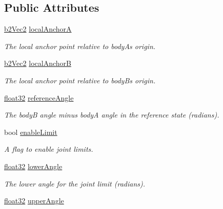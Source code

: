 \subsection*{Public Attributes}
\begin{DoxyCompactItemize}
\item 
\mbox{\hyperlink{structb2_vec2}{b2\+Vec2}} \mbox{\hyperlink{structb2_revolute_joint_def_a76337d07aa63232a7b20d50decc862ae}{local\+AnchorA}}
\begin{DoxyCompactList}\small\item\em The local anchor point relative to bodyA\textquotesingle{}s origin. \end{DoxyCompactList}\item 
\mbox{\hyperlink{structb2_vec2}{b2\+Vec2}} \mbox{\hyperlink{structb2_revolute_joint_def_a3f33bc1d9f6c22043a5ff2f1d89f04e0}{local\+AnchorB}}
\begin{DoxyCompactList}\small\item\em The local anchor point relative to bodyB\textquotesingle{}s origin. \end{DoxyCompactList}\item 
\mbox{\hyperlink{b2_settings_8h_aacdc525d6f7bddb3ae95d5c311bd06a1}{float32}} \mbox{\hyperlink{structb2_revolute_joint_def_a1858d897d5fea04c5e606a1ff73f64f8}{reference\+Angle}}
\begin{DoxyCompactList}\small\item\em The bodyB angle minus bodyA angle in the reference state (radians). \end{DoxyCompactList}\item 
bool \mbox{\hyperlink{structb2_revolute_joint_def_a2eaefc5fc5caf879cfd59ebcd852b756}{enable\+Limit}}
\begin{DoxyCompactList}\small\item\em A flag to enable joint limits. \end{DoxyCompactList}\item 
\mbox{\hyperlink{b2_settings_8h_aacdc525d6f7bddb3ae95d5c311bd06a1}{float32}} \mbox{\hyperlink{structb2_revolute_joint_def_a24d0b2638a01405c77bd1c0de3e53de8}{lower\+Angle}}
\begin{DoxyCompactList}\small\item\em The lower angle for the joint limit (radians). \end{DoxyCompactList}\item 
\mbox{\hyperlink{b2_settings_8h_aacdc525d6f7bddb3ae95d5c311bd06a1}{float32}} \mbox{\hyperlink{structb2_revolute_joint_def_a692cfe333ad12afd5753a6ec54e39a66}{upper\+Angle}}

\end{DoxyCompactItemize}
